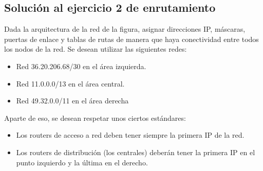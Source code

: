 \documentclass[letterpaper,10pt,spanish]{sphinxmanual}
\begin{document}
\subsection{Solución al ejercicio 2 de enrutamiento}
\label{\detokenize{t2_integracion_elementos/ejercicios_subredes_ipv4/ejercicios_dos_router:solucion-al-ejercicio-2-de-enrutamiento}}
\sphinxAtStartPar
Dada la arquitectura de la red de la figura, asignar direcciones IP, máscaras, puertas de enlace y tablas de rutas de manera que haya conectividad entre todos
los nodos de la red. Se desean utilizar las siguientes redes:
\begin{itemize}
\item {} 
\sphinxAtStartPar
Red 36.20.206.68/30 en el área izquierda.

\item {} 
\sphinxAtStartPar
Red 11.0.0.0/13 en el área central.

\item {} 
\sphinxAtStartPar
Red 49.32.0.0/11 en el área derecha

\end{itemize}

\begin{figure}[htbp]
\centering

\noindent{}
\end{figure}

\sphinxAtStartPar
Aparte de eso, se desean respetar unos ciertos estándares:
\begin{itemize}
\item {} 
\sphinxAtStartPar
Los routers de acceso a red deben tener siempre la primera IP de la red.

\item {} 
\sphinxAtStartPar
Los routers de distribución (los centrales) deberán tener la primera IP en el punto izquierdo y la última en el derecho.

\end{itemize}
\end{document}

